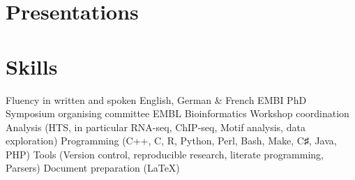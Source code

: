 \documentclass{klmr-cv}
\newcommand*\csharp{C♯}
\newcommand*\cpp{C++}
\begin{document}
\section{Presentations}

\section{Skills}

\begin{itemize}
    \listitem Fluency in written and spoken English, German \& French
    \listitem EMBI PhD Symposium organising committee
    \listitem EMBL Bioinformatics Workshop coordination
    \listitem Analysis (HTS, in particular RNA-seq, ChIP-seq, Motif analysis,
        data exploration)
    \listitem Programming (\cpp, C, R, Python, Perl, Bash, Make, \csharp, Java, PHP)
    \listitem Tools (Version control, reproducible research, literate
        programming, Parsers)
    \listitem Document preparation (\LaTeX)
\end{itemize}
\end{document}

